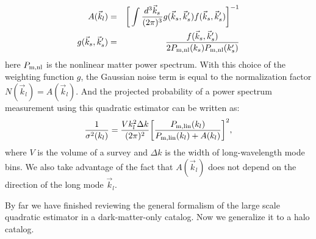 \documentclass[prd,amsmath,amssymb,floatfix,superscriptaddress,nofootinbib,twocolumn]{revtex4-1}
\def\be{\begin{equation}}
\def\ee{\end{equation}}
\newcommand{\vs}{\nonumber\\}
\newcommand{\vk}{\vec{k}}
\newcommand{\eql}[1]{\label{eq:#1}}
\begin{document}
\begin{eqnarray}
A(\vec{k}_l)&=&\bigg[\int \frac{d^3 \vec{k}_s}{(2\pi)^3} g(\vec{k}_s,\vec{k}_s')f(\vec{k}_s,\vec{k}_s')  \bigg]^{-1} \eql{a} \vs
g(\vec{k}_{s},\vec{k}_{s}')&=&\frac{f(\vec{k}_{s},\vec{k}_{s}')}{2P_{\rm m,nl}(k_{s})P_{\rm m,nl}(k_{s}')}
\end{eqnarray}
here $P_{\rm m,nl}$ is the nonlinear matter power spectrum. With this choice of the weighting function $g$, the Gaussian noise term is equal to the normalization factor $N(\vk_l)=A(\vk_l)$. And the projected probability of a power spectrum measurement using this quadratic estimator can be written as:
\be
\frac{1}{\sigma^{2}(k_l)}=\frac{V k_l^2 \Delta k }{(2\pi)^2}\bigg[\frac{P_{\rm m,lin}(k_l)}{P_{\rm m,lin}(k_l)+A(k_l) }\bigg]^2 \eql{error},
\ee
where $V$ is the volume of a survey and $\Delta k$ is the width of long-wavelength mode bins. We also take advantage of the fact that $A(\vk_l)$ does not depend on the direction of the long mode $\vk_l$.

By far we have finished reviewing the general formalism of the large scale quadratic estimator in a dark-matter-only catalog. Now we generalize it to a halo catalog.
\end{document}
